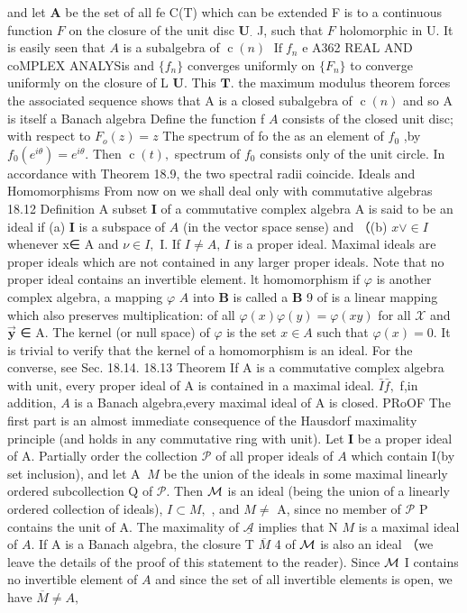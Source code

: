 and let ${\boldsymbol{A}}$ be the set of all fe C(T) which can be extended F is to a continuous function ${\mathbf{}}F$ on the closure of the unit disc ${\boldsymbol{U}}_{\cdot}$ J, such that ${\mathbf{}}F$ holomorphic in U. It is easily seen that $\scriptstyle A$ is a subalgebra of $\operatorname{c}(n)$ $\operatorname{If}f_{n}$ e A362 REAL AND coMPLEX ANALYSis and $\{f_{n}\}$ converges uniformly on $\{F_{n}\}$ to converge uniformly on the closure of L ${\boldsymbol{U}}.$ This ${\boldsymbol{T}}.$ the maximum modulus theorem forces the associated sequence shows that A is a closed subalgebra of $\operatorname{c}(n)$ and so A is itself a Banach algebra Define the function f $\scriptstyle A$ consists of the closed unit disc; with respect to $F_{o}(z)=z$ The spectrum of fo the as an element of $f_{0}$ ,by $f_{0}(e^{i\theta})=e^{i\theta}.$ Then $\operatorname{c}(t),$ spectrum of $f_{\mathrm{0}}$ consists only of the unit circle. In accordance with Theorem 18.9, the two spectral radii coincide. Ideals and Homomorphisms From now on we shall deal only with commutative algebras 18.12 Definition A subset ${\mathbf I}$ of a commutative complex algebra A is said to be an ideal if (a) ${\mathbf I}$ is a subspace of $\scriptstyle A$ (in the vector space sense) and （(b) $\scriptstyle x\lor\in I$ whenever x∈ A and $\nu\in I,$ I. If $I\neq A,\,I$ is a proper ideal. Maximal ideals are proper ideals which are not contained in any larger proper ideals. Note that no proper ideal contains an invertible element. lt homomorphism if $\varphi$ is another complex algebra, a mapping $\varphi$ $\scriptstyle A$ into $\boldsymbol{B}$ is called a $\boldsymbol{B}$ 9 of is a linear mapping which also preserves multiplication: of all $\varphi(x)\varphi(y)=\varphi(x y)$ for all $\scriptstyle{\mathcal{X}}$ and $\mathbf{\vec{y}}$ ∈ A. The kernel (or null space) of $\varphi$ is the set $x\in A$ such that $\varphi(x)=0.$ It is trivial to verify that the kernel of a homomorphism is an ideal. For the converse, see Sec. 18.14. 18.13 Theorem If A is a commutative complex algebra with unit, every proper ideal of A is contained in a maximal ideal. ${\bar{I}}{\bar{f}},$ f,in addition, $\scriptstyle A$ is a Banach algebra,every maximal ideal of A is closed. PRoOF The first part is an almost immediate consequence of the Hausdorf maximality principle (and holds in any commutative ring with unit). Let ${\mathbf I}$ be a proper ideal of A. Partially order the collection ${\mathcal{P}}$ of all proper ideals of $\scriptstyle A$ which contain I(by set inclusion), and let A $\ M$ be the union of the ideals in some maximal linearly ordered subcollection Q of ${\mathcal{P}}.$ Then ${\cal{M}}$ is an ideal (being the union of a linearly ordered collection of ideals), $I\subset M,$ , and $M\neq$ A, since no member of ${\mathcal{P}}$ P contains the unit of A. The maximality of $\underline{{\mathcal{A}}}$ implies that N $\textstyle{M}$ is a maximal ideal of $A.$ If A is a Banach algebra, the closure T $\overline{{M}}$ 4 of ${\cal{M}}$ is also an ideal （we leave the details of the proof of this statement to the reader). Since ${\cal{M}}$ I contains no invertible element of $\scriptstyle A$ and since the set of all invertible elements is open, we have ${\overline{{M}}}\neq A,$ 